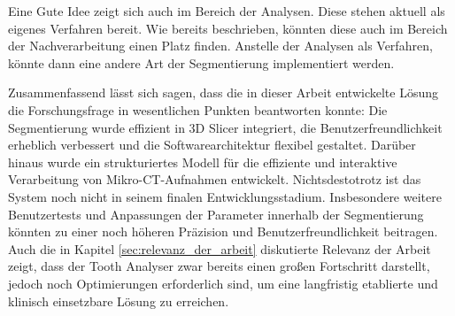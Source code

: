 Eine Gute Idee zeigt sich auch im Bereich der Analysen. Diese stehen aktuell als
eigenes Verfahren bereit. Wie bereits beschrieben, könnten diese auch im Bereich
der Nachverarbeitung einen Platz finden. Anstelle der Analysen als Verfahren,
könnte dann eine andere Art der Segmentierung implementiert werden.

Zusammenfassend lässt sich sagen, dass die in dieser Arbeit entwickelte Lösung die
Forschungsfrage in wesentlichen Punkten beantworten konnte: Die Segmentierung
wurde effizient in 3D Slicer integriert, die Benutzerfreundlichkeit erheblich verbessert
und die Softwarearchitektur flexibel gestaltet. Darüber hinaus wurde ein
strukturiertes Modell für die effiziente und interaktive Verarbeitung von Mikro-\ac{CT}-Aufnahmen
entwickelt. Nichtsdestotrotz ist das System noch nicht in seinem finalen
Entwicklungsstadium. Insbesondere weitere Benutzertests und Anpassungen der Parameter
innerhalb der Segmentierung könnten zu einer noch höheren Präzision und Benutzerfreundlichkeit
beitragen. Auch die in Kapitel \ref{sec:relevanz_der_arbeit} diskutierte
Relevanz der Arbeit zeigt, dass der Tooth Analyser zwar bereits einen großen Fortschritt
darstellt, jedoch noch Optimierungen erforderlich sind, um eine langfristig etablierte
und klinisch einsetzbare Lösung zu erreichen.

